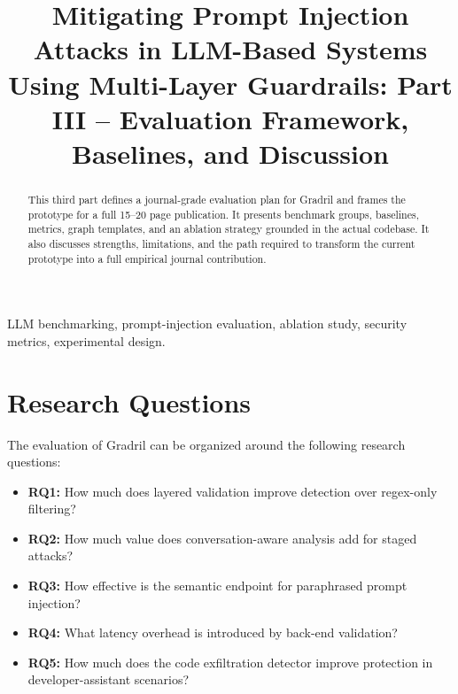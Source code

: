 \documentclass[journal]{IEEEtran}
\begin{document}
\title{Mitigating Prompt Injection Attacks in LLM-Based Systems Using Multi-Layer Guardrails: Part III -- Evaluation Framework, Baselines, and Discussion}

\author{
}

\maketitle
\setcounter{page}{11}

\begin{abstract}
This third part defines a journal-grade evaluation plan for Gradril and frames the prototype for a full 15--20 page publication. It presents benchmark groups, baselines, metrics, graph templates, and an ablation strategy grounded in the actual codebase. It also discusses strengths, limitations, and the path required to transform the current prototype into a full empirical journal contribution.
\end{abstract}

\begin{IEEEkeywords}
LLM benchmarking, prompt-injection evaluation, ablation study, security metrics, experimental design.
\end{IEEEkeywords}

\section{Research Questions}
The evaluation of Gradril can be organized around the following research questions:
\begin{itemize}
    \item \textbf{RQ1:} How much does layered validation improve detection over regex-only filtering?
    \item \textbf{RQ2:} How much value does conversation-aware analysis add for staged attacks?
    \item \textbf{RQ3:} How effective is the semantic endpoint for paraphrased prompt injection?
    \item \textbf{RQ4:} What latency overhead is introduced by back-end validation?
    \item \textbf{RQ5:} How much does the code exfiltration detector improve protection in developer-assistant scenarios?
\end{itemize}
\end{document}
